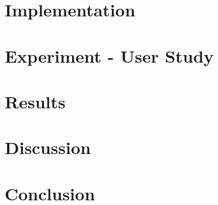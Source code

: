 \documentclass[10pt,twoside]{report}
\begin{document}
\chapter{Implementation}
\label{sec:Implementation}

\cleardoublepage

\chapter{Experiment - User Study}
\label{sec:Experiment}

\cleardoublepage


\chapter{Results}
\label{sec:Results}

\cleardoublepage


\chapter{Discussion}
\label{sec:Discussion}

\cleardoublepage

\chapter{Conclusion}

\cleardoublepage


\cleardoublepage

\appendix

\end{document}
